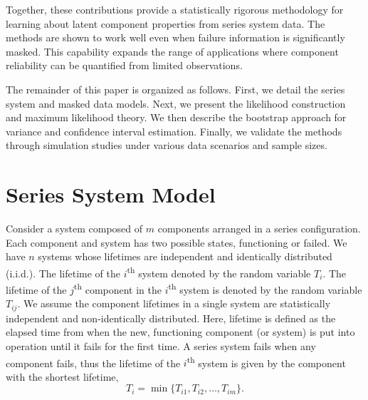 \documentclass[
]{article}
\begin{document}
Together, these contributions provide a statistically rigorous
methodology for learning about latent component properties from series
system data. The methods are shown to work well even when failure
information is significantly masked. This capability expands the range
of applications where component reliability can be quantified from
limited observations.

The remainder of this paper is organized as follows. First, we detail
the series system and masked data models. Next, we present the
likelihood construction and maximum likelihood theory. We then describe
the bootstrap approach for variance and confidence interval estimation.
Finally, we validate the methods through simulation studies under
various data scenarios and sample sizes.

\hypertarget{sec:statmod}{%
\section{Series System Model}\label{sec:statmod}}

Consider a system composed of \(m\) components arranged in a series
configuration. Each component and system has two possible states,
functioning or failed. We have \(n\) systems whose lifetimes are
independent and identically distributed (i.i.d.). The lifetime of the
\(i\)\textsuperscript{th} system denoted by the random variable
\(T_{i}\). The lifetime of the \(j\)\textsuperscript{th} component in
the \(i\)\textsuperscript{th} system is denoted by the random variable
\(T_{i j}\). We assume the component lifetimes in a single system are
statistically independent and non-identically distributed. Here,
lifetime is defined as the elapsed time from when the new, functioning
component (or system) is put into operation until it fails for the first
time. A series system fails when any component fails, thus the lifetime
of the \(i\)\textsuperscript{th} system is given by the component with
the shortest lifetime, \[
    T_i = \min\bigr\{T_{i 1},T_{i 2}, \ldots, T_{i m} \bigr\}.
\]
\end{document}
